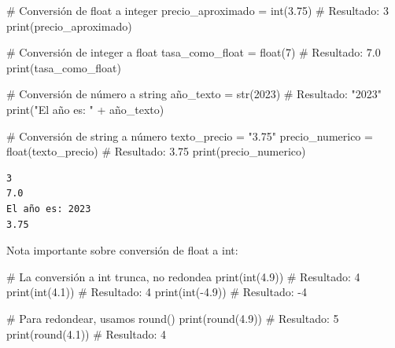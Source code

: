 \documentclass[
  doc,
  floatsintext,
  longtable,
  a4paper,
  nolmodern,
  notxfonts,
  notimes,
  12pt,
  colorlinks=true,linkcolor=blue,citecolor=blue,urlcolor=blue]{apa7}
\newenvironment{Shaded}{\begin{snugshade}}{\end{snugshade}}
\newcommand{\BuiltInTok}[1]{\textcolor[rgb]{0.00,0.23,0.31}{#1}}
\newcommand{\CommentTok}[1]{\textcolor[rgb]{0.37,0.37,0.37}{#1}}
\newcommand{\DecValTok}[1]{\textcolor[rgb]{0.68,0.00,0.00}{#1}}
\newcommand{\FloatTok}[1]{\textcolor[rgb]{0.68,0.00,0.00}{#1}}
\newcommand{\NormalTok}[1]{\textcolor[rgb]{0.00,0.23,0.31}{#1}}
\newcommand{\OperatorTok}[1]{\textcolor[rgb]{0.37,0.37,0.37}{#1}}
\newcommand{\StringTok}[1]{\textcolor[rgb]{0.13,0.47,0.30}{#1}}
\begin{document}
\begin{Shaded}
\begin{Highlighting}[]
\CommentTok{\# Conversión de float a integer}
\NormalTok{precio\_aproximado }\OperatorTok{=} \BuiltInTok{int}\NormalTok{(}\FloatTok{3.75}\NormalTok{)  }\CommentTok{\# Resultado: 3}
\BuiltInTok{print}\NormalTok{(precio\_aproximado)}

\CommentTok{\# Conversión de integer a float}
\NormalTok{tasa\_como\_float }\OperatorTok{=} \BuiltInTok{float}\NormalTok{(}\DecValTok{7}\NormalTok{)  }\CommentTok{\# Resultado: 7.0}
\BuiltInTok{print}\NormalTok{(tasa\_como\_float)}

\CommentTok{\# Conversión de número a string}
\NormalTok{año\_texto }\OperatorTok{=} \BuiltInTok{str}\NormalTok{(}\DecValTok{2023}\NormalTok{)  }\CommentTok{\# Resultado: "2023"}
\BuiltInTok{print}\NormalTok{(}\StringTok{"El año es: "} \OperatorTok{+}\NormalTok{ año\_texto)}

\CommentTok{\# Conversión de string a número}
\NormalTok{texto\_precio }\OperatorTok{=} \StringTok{"3.75"}
\NormalTok{precio\_numerico }\OperatorTok{=} \BuiltInTok{float}\NormalTok{(texto\_precio)  }\CommentTok{\# Resultado: 3.75}
\BuiltInTok{print}\NormalTok{(precio\_numerico)}
\end{Highlighting}
\end{Shaded}

\begin{verbatim}
3
7.0
El año es: 2023
3.75
\end{verbatim}

Nota importante sobre conversión de float a int:

\begin{Shaded}
\begin{Highlighting}[]
\CommentTok{\# La conversión a int trunca, no redondea}
\BuiltInTok{print}\NormalTok{(}\BuiltInTok{int}\NormalTok{(}\FloatTok{4.9}\NormalTok{))   }\CommentTok{\# Resultado: 4}
\BuiltInTok{print}\NormalTok{(}\BuiltInTok{int}\NormalTok{(}\FloatTok{4.1}\NormalTok{))   }\CommentTok{\# Resultado: 4}
\BuiltInTok{print}\NormalTok{(}\BuiltInTok{int}\NormalTok{(}\OperatorTok{{-}}\FloatTok{4.9}\NormalTok{))  }\CommentTok{\# Resultado: {-}4}

\CommentTok{\# Para redondear, usamos round()}
\BuiltInTok{print}\NormalTok{(}\BuiltInTok{round}\NormalTok{(}\FloatTok{4.9}\NormalTok{))  }\CommentTok{\# Resultado: 5}
\BuiltInTok{print}\NormalTok{(}\BuiltInTok{round}\NormalTok{(}\FloatTok{4.1}\NormalTok{))  }\CommentTok{\# Resultado: 4}
\end{Highlighting}
\end{Shaded}
\end{document}
